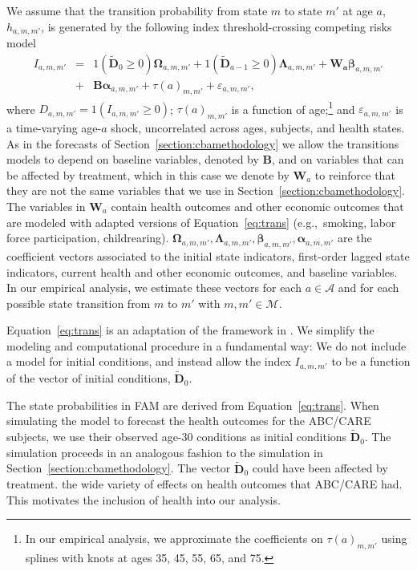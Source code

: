 We assume that the transition probability from state $m$ to state $m'$ at age $a$, $h_{a,m,m'}$, is generated by the following index threshold-crossing competing risks model
\begin{eqnarray}
I_{a,m,m'} &=& \bm{\mathit{1}} \left( \tilde{\bm{D}}_{0} \geq 0 \right) \bm{\Omega}_{a,m,m'} + \bm{\mathit{1}} \left( \tilde{\bm{D}}_{a-1} \geq 0\right) \bm{\Lambda}_{a,m,m'}  + \bm{W_a} \bm{\beta}_{a,m,m'}  \nonumber \\ 
&+&  \bm{B} \bm{\alpha}_{a,m,m'} + \tau \left( a \right)_{m,m'} + \varepsilon_{a,m,m'}, \label{eq:trans}
\end{eqnarray}
where $D_{a,m,m'} = \bm{\mathit{1}}  \left( I_{a,m,m'} \geq 0 \right)$; $\tau \left( a \right)_{m,m'}$ is a function of age;\footnote{In our empirical analysis, we approximate the coefficients on $\tau \left( a \right)_{m,m'}$ using splines with knots at ages 35, 45, 55, 65, and 75.} and $\varepsilon_{a,m,m'}$ is a time-varying age-$a$ shock, uncorrelated across ages, subjects, and health states. As in the forecasts of Section~\ref{section:cbamethodology} we allow the transitions models to depend on baseline variables, denoted by $\bm{B}$, and on variables that can be affected by treatment, which in this case we denote by $\bm{W}_a$ to reinforce that they are not the same variables that we use in Section~\ref{section:cbamethodology}. The variables in $\bm{W}_a$ contain health outcomes and other economic outcomes that are modeled with adapted versions of Equation~\eqref{eq:trans} (e.g.,\ smoking, labor force participation, childrearing). $ \bm{\Omega}_{a,m,m'},  \bm{\Lambda}_{a,m,m'}, \bm{\beta}_{a,m,m'},  \bm{\alpha}_{a,m,m'}$ are the coefficient vectors associated to the initial state indicators, first-order lagged state indicators, current health and other economic outcomes, and baseline variables. In our empirical analysis, we estimate these vectors for each $a \in \mathcal{A}$ and for each possible state transition from $m$ to $m'$ with $m,m' \in \mathcal{M}$.

Equation~\eqref{eq:trans} is an adaptation of the framework in \citet{Heckman_1981_heterogeneity,Heckman_1981_IncidentalParametersProblem}. We simplify the modeling and computational procedure in a fundamental way: We do not include a model for initial conditions, and instead allow the index $I_{a,m,m'} $ to be a function of the vector of initial conditions, $\tilde{\bm{D}}_{0}$.

The state probabilities in FAM are derived from Equation~\eqref{eq:trans}. When simulating the model to forecast the health outcomes for the ABC/CARE subjects, we use their observed age-30 conditions as initial conditions  $\tilde{\bm{D}}_0$. The simulation proceeds in an analogous fashion to the simulation in Section~\ref{section:cbamethodology}. The vector $\tilde{\bm{D}}_0$ could have been affected by treatment. \citet{Campbell_Conti_etal_2014_EarlyChildhoodInvestments} the wide variety of effects on health outcomes that ABC/CARE had. This motivates the inclusion of health into our analysis.

